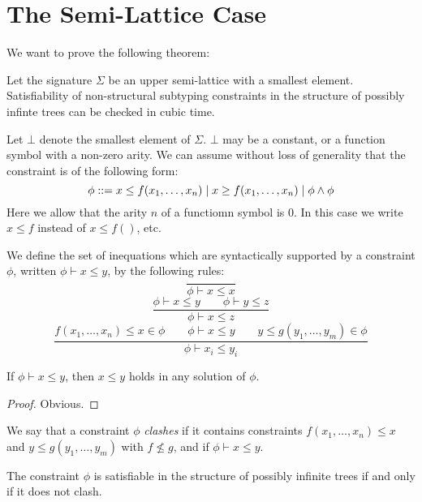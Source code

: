 \section{The Semi-Lattice Case}

We want to prove the following theorem:

\begin{satz}
\label{uppersemilatice}
Let the signature $\Sigma$ be an upper semi-lattice with a smallest
element. Satisfiability of non-structural subtyping constraints in the
structure of possibly infinte trees can be checked in cubic time.
\end{satz}

Let $\bot$ denote the smallest element of $\Sigma$. $\bot$ may be a
constant, or a function symbol with a non-zero arity. We can assume
without loss of generality that the constraint is of the following
form:
\[
\phi ::= x \leq f(x_1,\ldots,x_n) \mid x \geq f(x_1,\ldots,x_n) \mid \phi \wedge \phi
\]
Here we allow that the arity $n$ of a functiomn symbol is $0$. In this
case we write $x \leq f$ instead of $x \leq f()$, etc.

We define the set of inequations which are syntactically supported by
a constraint $\phi$, written $\phi \vdash x \leq y$, by the following
rules:
\[ \frac{}{\phi \vdash x \leq x}\]
\[ \frac{\phi \vdash x \leq y \qquad \phi \vdash y \leq z}{\phi \vdash
  x \leq z} \]
\[ \frac{f(x_1,\ldots,x_n)\leq x \in \phi
  \qquad \phi \vdash x \leq y
  \qquad y \leq g(y_1,\ldots,y_m) \in \phi}{\phi \vdash x_i \leq
  y_i}\]

\begin{lemma}
  If $\phi\vdash x\leq y$, then $x\leq y$ holds in any solution of
  $\phi$.
\end{lemma}
\begin{proof}
Obvious.
\end{proof}

We say that a constraint $\phi$ \emph{clashes} if it contains
constraints $f(x_1,\ldots,x_n) \leq x$ and $y \leq g(y_1,\ldots,y_m)$
with $f \not\leq g$, and if $\phi \vdash x \leq y$.

\begin{lemma}
  The constraint $\phi$ is satisfiable in the structure of possibly
  infinite trees if and only if it does not clash.
\end{lemma}

